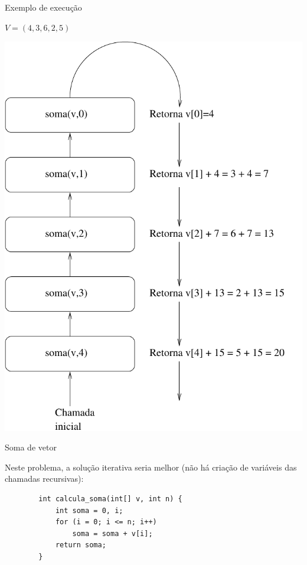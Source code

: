 \documentclass[handout]{beamer}
\begin{document}
\begin{frame}[fragile]{Exemplo de execução}

    \begin{minipage}{0.4\textwidth}
        $V = (4,3,6,2,5)$
    \end{minipage}
    \begin{minipage}{0.5\textwidth}
    \begin{center}
        \includegraphics[scale=0.5]{somavetor}
    \end{center}
    \end{minipage}

\end{frame}

\begin{frame}[fragile]{Soma de vetor}

    Neste problema, a solução iterativa seria melhor (não há criação de variáveis das chamadas recursivas):
    \begin{verbatim}
        int calcula_soma(int[] v, int n) {
            int soma = 0, i;
            for (i = 0; i <= n; i++)
                soma = soma + v[i];
            return soma;
        }
    \end{verbatim}

\end{frame}
\end{document}
